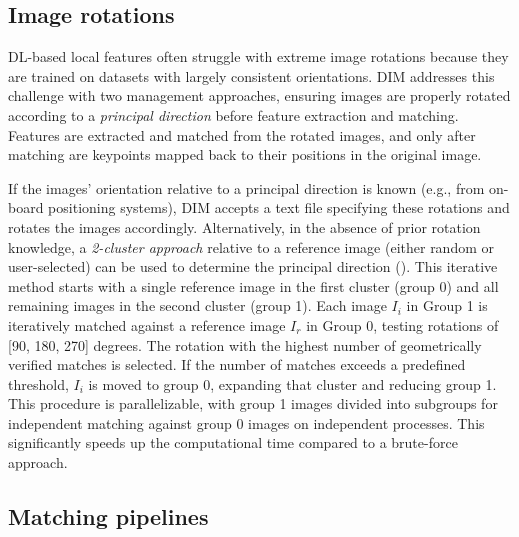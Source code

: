 \subsection{Image rotations}

DL-based local features often struggle with extreme image rotations because they are trained on datasets with largely consistent orientations. 
DIM addresses this challenge with two management approaches, ensuring images are properly rotated according to a \textit{principal direction} before feature extraction and matching.
Features are extracted and matched from the rotated images, and only after matching are keypoints mapped back to their positions in the original image.

If the images' orientation relative to a principal direction is known (e.g., from on-board positioning systems), DIM accepts a text file specifying these rotations and rotates the images accordingly.
Alternatively, in the absence of prior rotation knowledge, a \textit{2-cluster approach} relative to a reference image (either random or user-selected) can be used to determine the principal direction ().
This iterative method starts with a single reference image in the first cluster (group 0) and all remaining images in the second cluster (group 1). 
Each image $I_i$ in Group 1 is iteratively matched against a reference image $I_r$ in Group 0, testing rotations of [90, 180, 270] degrees. 
The rotation with the highest number of geometrically verified matches is selected. 
If the number of matches exceeds a predefined threshold, $I_i$ is moved to group 0, expanding that cluster and reducing group 1. 
This procedure is parallelizable, with group 1 images divided into subgroups for independent matching against group 0 images on independent processes.
This significantly speeds up the computational time compared to a brute-force approach. 

\subsection{Matching pipelines}

